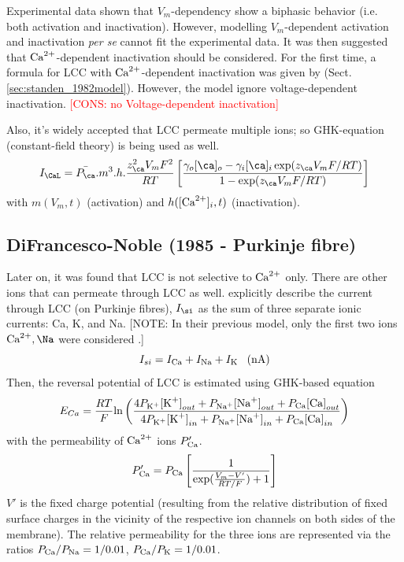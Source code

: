 Experimental data shown that $V_m$-dependency show a biphasic behavior (i.e.
both activation and inactivation). However, modelling $V_m$-dependent activation
and inactivation {\it per se} cannot fit the experimental data. It was then
suggested that ${\text{Ca}^{2+}}$-dependent inactivation should be considered. For the first
time, a formula for LCC with ${\text{Ca}^{2+}}$-dependent inactivation was given by
\citep{standen1982bsm} (Sect.\ref{sec:standen_1982model}). However, the model
ignore voltage-dependent inactivation. \textcolor{red}{[CONS: no
Voltage-dependent inactivation]}
 
Also, it's widely accepted that LCC permeate multiple ions; so GHK-equation
(constant-field theory) is being used as well.
\begin{equation}
I_\CaL = \bar{P_\ca}.m^3.h.\frac{z_\ca ^2V_mF^2}{RT} \left[
     \frac{ \gamma_{o}[\ca]_o-\gamma_{i}[\ca]_i\exp(z_\ca V_mF/RT)}{1-\exp(z_\ca V_mF/RT)}\right]
\end{equation}
with $m(V_m,t)$ (activation) and $h([{\text{Ca}^{2+}}]_i,t)$ (inactivation).


\subsection{DiFrancesco-Noble (1985 - Purkinje fibre)}
\label{sec:difr-noble-1985}

Later on, it was found that LCC is not selective to ${\text{Ca}^{2+}}$ only. There are other
ions that can permeate through LCC as well. \citep{difrancesco1985mcea}
explicitly describe the current through LCC (on Purkinje fibres), $I_\si$ as the
sum of three separate ionic currents: Ca, K, and Na. [NOTE: In their previous
model, only the first two ions $\Ca, \Na$ were considered
\citep{reuter1977sic}.]
\begin{equation}
  \label{eq:864}
  I_{si} = I_{\ce{Ca}} + I_{\ce{Na}} + I_{\ce{K}} \;\;\;\text{(nA)}
\end{equation}
Then, the reversal potential of LCC is estimated using GHK-based equation
\begin{equation}
  \label{eq:862}
  E_{Ca} = \frac{RT}{F} \ln \left( \frac{
      4P_{\ce{K^+}}\ce{[K^+]}_{out} +  P_{\ce{Na^+}}\ce{[Na^+]}_{out} +  P_{\ce{Ca}}\ce{[Ca]}_{out} 
    }{ 4P_{\ce{K^+}}\ce{[K^+]}_{in} +  P_{\ce{Na^+}}\ce{[Na^+]}_{in} +  P_{\ce{Ca}}\ce{[Ca]}_{in} 
    } \right)
\end{equation}
with the permeability of ${\text{Ca}^{2+}}$ ions $P'_{\ce{Ca}}$.
\begin{equation}
  \label{eq:863}
  P'_{\ce{Ca}} = P_{\ce{Ca}} \left[ \frac{1}{\exp(\frac{V_m - V'}{RT/F}) +
      1 }\right] 
\end{equation}
$V'$ is the fixed charge potential (resulting from the relative distribution
of fixed surface charges in the vicinity of the respective ion
channels on both sides of the membrane). The relative permeability for the three
ions are represented via the ratios $P_{\ce{Ca}}/P_{\ce{Na}} = 1/0.01$,
$P_{\ce{Ca}}/P_{\ce{K}}=1/0.01$. 

